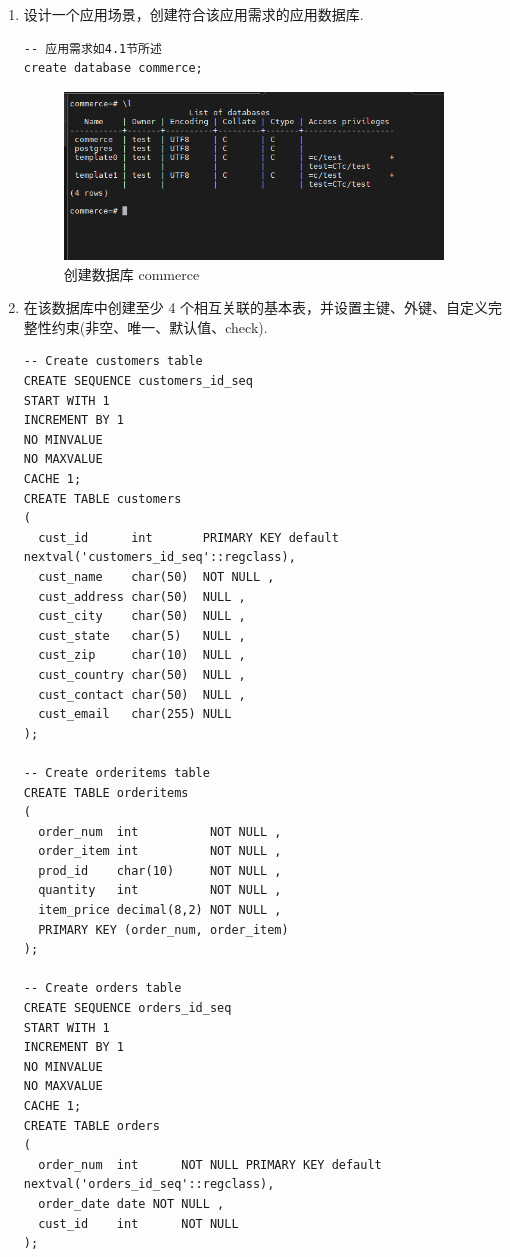 \begin{enumerate}
  \item 设计一个应用场景，创建符合该应用需求的应用数据库.
\begin{center}
\begin{verbatim}
-- 应用需求如4.1节所述
create database commerce;
\end{verbatim}
\end{center}
\begin{figure}[H]
  \begin{center}
    \includegraphics[width=0.95\textwidth,scale=0.5]{./figures/create_database.png}
  \end{center}
  \caption{创建数据库 commerce}
\end{figure}
  \item 在该数据库中创建至少 4 个相互关联的基本表，并设置主键、外键、自定义完整性约束(非空、唯一、默认值、check).
\begin{center}
\begin{verbatim}
-- Create customers table
CREATE SEQUENCE customers_id_seq
START WITH 1
INCREMENT BY 1
NO MINVALUE
NO MAXVALUE
CACHE 1;
CREATE TABLE customers
(
  cust_id      int       PRIMARY KEY default nextval('customers_id_seq'::regclass),
  cust_name    char(50)  NOT NULL ,
  cust_address char(50)  NULL ,
  cust_city    char(50)  NULL ,
  cust_state   char(5)   NULL ,
  cust_zip     char(10)  NULL ,
  cust_country char(50)  NULL ,
  cust_contact char(50)  NULL ,
  cust_email   char(255) NULL
);

-- Create orderitems table
CREATE TABLE orderitems
(
  order_num  int          NOT NULL ,
  order_item int          NOT NULL ,
  prod_id    char(10)     NOT NULL ,
  quantity   int          NOT NULL ,
  item_price decimal(8,2) NOT NULL ,
  PRIMARY KEY (order_num, order_item)
);

-- Create orders table
CREATE SEQUENCE orders_id_seq
START WITH 1
INCREMENT BY 1
NO MINVALUE
NO MAXVALUE
CACHE 1;
CREATE TABLE orders
(
  order_num  int      NOT NULL PRIMARY KEY default nextval('orders_id_seq'::regclass),
  order_date date NOT NULL ,
  cust_id    int      NOT NULL
);


\end{verbatim}
\end{center}
\end{enumerate}
